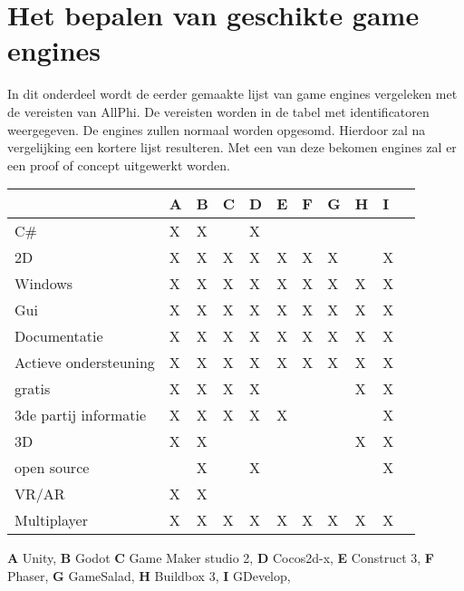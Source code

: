 \section{Het bepalen van geschikte game engines}
In dit onderdeel wordt de eerder gemaakte lijst van game engines vergeleken met de vereisten van AllPhi. De vereisten worden in de tabel met identificatoren weergegeven. De engines zullen normaal worden opgesomd. Hierdoor zal na vergelijking een kortere lijst resulteren. Met een van deze bekomen engines zal er een proof of concept uitgewerkt worden.
\\
\begin{center}
\begin{tabular}{ | m{8em} | m{1cm}| m{1cm} |m{1cm}| m{1cm}| m{1cm} |m{1cm}| m{1cm} |m{1cm}| m{1cm} | m{1cm} | } 
    \hline
     & A & B & C & D & E & F & G & H & I\\
    \hline
    C\# & X & X &  & X &  &  &  &  &  \\ 
    \hline
    2D & X & X & X & X & X & X & X &  & X \\ 
    \hline
    Windows & X & X & X & X & X & X & X & X & X \\ 
    \hline
    Gui & X & X & X & X & X & X & X & X & X \\ 
    \hline
    Documentatie & X & X & X & X & X & X & X & X & X \\ 
    \hline
    Actieve ondersteuning & X & X & X & X & X & X & X & X & X \\ 
    \hline
    gratis & X & X & X & X &  &  &  & X & X \\ 
    \hline
    3de partij informatie & X & X & X & X & X &  &  &  & X \\ 
    \hline
    3D & X & X &  &  &  &  &  & X & X \\ 
    \hline
    open source &  & X &  & X &  &  &  &  & X \\ 
    \hline
    VR/AR & X & X &  &  &  &  &  &  &  \\ 
    \hline
    Multiplayer & X & X & X & X & X & X & X & X & X \\ 
    \hline
\end{tabular}
\end{center}
\textbf{A} Unity,
\textbf{B} Godot
\textbf{C} Game Maker studio 2,
\textbf{D} Cocos2d-x,
\textbf{E} Construct 3,
\textbf{F} Phaser,
\textbf{G} GameSalad,
\textbf{H} Buildbox 3,
\textbf{I} GDevelop,
